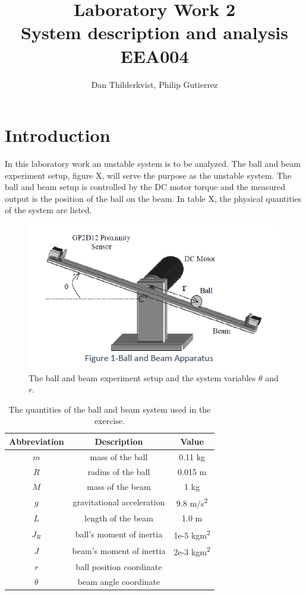 \documentclass[a4paper, titlepage]{article}
\title{Laboratory Work 2\\
System description and analysis\\
\large EEA004}
\author{Dan Thilderkvist, Philip Gutierrez}
\begin{document}
\maketitle

\section{Introduction}
In this laboratory work an unstable system is to be analyzed.
The ball and beam experiment setup, figure X, will serve the purpose as the unstable system.
The ball and beam setup is controlled by the DC motor torque and the measured output is the position of the ball on the beam.
In table X, the physical quantities of the system are listed.

\begin{figure}[h!]
\center
\includegraphics[scale=0.8]{../figures/ballAndBeam.png}
\caption{The ball and beam experiment setup and the system variables $\theta$ and $r$.}
\label{fig:ballAndBeam}
\end{figure}

\begin{table}[h!]
\centering
 \begin{tabular}{||c c c||} 
 \hline
 Abbreviation & Description & Value \\ [0.5ex] 
 \hline\hline
 $m$ & mass of the ball & 0.11 kg \\ 
 $R$ & radius of the ball & 0.015 m \\
 $M$ & mass of the beam & 1 kg \\
 $g$ & gravitational acceleration & 9.8 m/s\textsuperscript{2} \\
 $L$ & length of the beam & 1.0 m \\
 $J_R$ & ball's moment of inertia & 1e-5 kgm\textsuperscript{2} \\
 $J$ & beam's moment of inertia & 2e-3 kgm\textsuperscript{2} \\
 $r$ & ball position coordinate & \\
 $\theta$ & beam angle coordinate &  \\ [1ex] 
 \hline
 \end{tabular}
 \caption{The quantities of the ball and beam system used in the exercise.}
 \label{tab:quantities}
\end{table}
\end{document}

